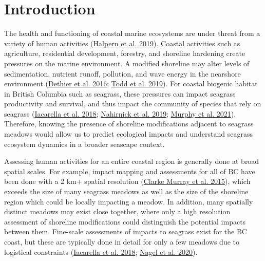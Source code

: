 \documentclass[12pt]{article}\usepackage[]{graphicx}\usepackage[]{color}
\begin{document}

\frontmatter


\renewcommand{\headrulewidth}{0.5pt}  %
\renewcommand{\footrulewidth}{0.5pt}  %

\newcommand{\lt}{\ensuremath <}
\newcommand{\gt}{\ensuremath >}

\newlength{\cslhangindent}
\setlength{\cslhangindent}{1.5em}
\newenvironment{cslreferences}%
  {}%
  {\par}

\hypertarget{introduction}{%
\section{Introduction}\label{introduction}}

The health and functioning of coastal marine ecosystems are under threat from a variety of human activities (\protect\hyperlink{ref-Halpern2019}{Halpern et al. 2019}). Coastal activities such as agriculture, residential development, forestry, and shoreline hardening create pressures on the marine environment. A modified shoreline may alter levels of sedimentation, nutrient runoff, pollution, and wave energy in the nearshore environment (\protect\hyperlink{ref-Dethier2016}{Dethier et al. 2016}; \protect\hyperlink{ref-Todd2019}{Todd et al. 2019}). For coastal biogenic habitat in British Columbia such as seagrass, these pressures can impact seagrass productivity and survival, and thus impact the community of species that rely on seagrass (\protect\hyperlink{ref-Iacarella2018}{Iacarella et al. 2018}; \protect\hyperlink{ref-Nahirnick2019}{Nahirnick et al. 2019}; \protect\hyperlink{ref-Murphy2021a}{Murphy et al. 2021}). Therefore, knowing the presence of shoreline modifications adjacent to seagrass meadows would allow us to predict ecological impacts and understand seagrass ecosystem dynamics in a broader seascape context.

Assessing human activities for an entire coastal region is generally done at broad spatial scales. For example, impact mapping and assessments for all of BC have been done with a 2 km+ spatial resolution (\protect\hyperlink{ref-ClarkeMurray2015}{Clarke Murray et al. 2015}), which exceeds the size of many seagrass meadows as well as the size of the shoreline region which could be locally impacting a meadow. In addition, many spatially distinct meadows may exist close together, where only a high resolution assessment of shoreline modifications could distinguish the potential impacts between them. Fine-scale assessments of impacts to seagrass exist for the BC coast, but these are typically done in detail for only a few meadows due to logistical constraints (\protect\hyperlink{ref-Iacarella2018}{Iacarella et al. 2018}; \protect\hyperlink{ref-Nagel2020}{Nagel et al. 2020}).
\end{document}
